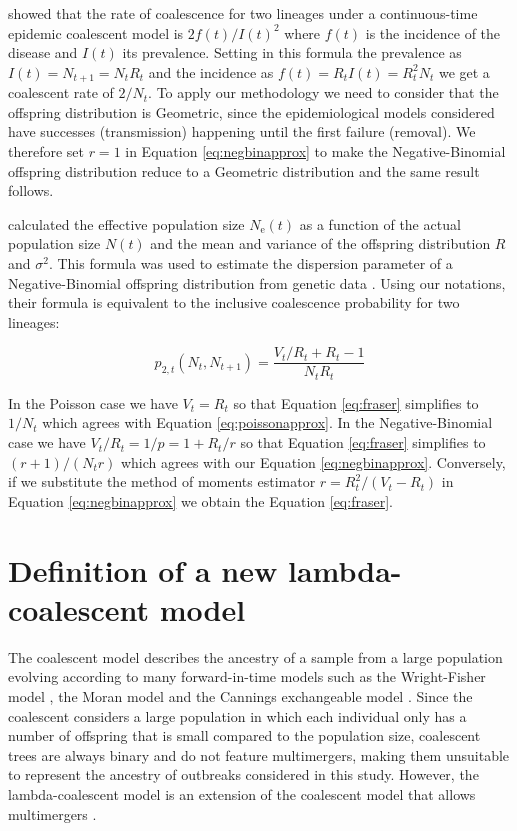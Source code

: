 \documentclass{article}
\renewcommand{\eqref}[1]{\ref{#1}}
\begin{document}
\citet{Volz2012a} showed that the rate of coalescence for two lineages under a continuous-time epidemic coalescent model is $2f(t)/I(t)^2$
 where $f(t)$ is the incidence of the disease and $I(t)$ its prevalence. 
 Setting in this formula the prevalence as $I(t)=N_{t+1}=N_t R_t$ and the incidence as
 $f(t)=R_t I(t)=R_t^2 N_t$ we get a coalescent rate of 
 $2/N_t$. To apply our methodology we need to consider that
the offspring distribution is Geometric, since the epidemiological
 models considered have successes (transmission) happening until the first failure
 (removal). We therefore set $r=1$ in Equation \eqref{eq:negbinapprox} 
 to make the Negative-Binomial offspring distribution
 reduce to a Geometric distribution and the same result follows.

\citet{Fraser2017} calculated the effective population size $N_\mathrm{e}(t)$ 
as a function of the actual population size $N(t)$ and the mean and variance of the offspring distribution $R$ and $\sigma^2$. %
This formula was used to estimate the dispersion parameter of a Negative-Binomial offspring distribution from genetic data \citep{Li2017}.
Using our notations, their formula is equivalent to the inclusive coalescence 
probability for two lineages:

\begin{equation}
 p_{2,t}(N_t, N_{t+1})=\frac{V_t/R_t+R_t-1}{N_t R_t}\label{eq:fraser}
 \end{equation}

In the Poisson case we have $V_t=R_t$ so that Equation \eqref{eq:fraser} simplifies to $1/N_t$ which agrees with Equation \eqref{eq:poissonapprox}. 
In the Negative-Binomial case we have $V_t/R_t=1/p=1+R_t/r$ so that Equation \eqref{eq:fraser}
simplifies to $(r+1)/(N_t r)$ which agrees with our Equation \eqref{eq:negbinapprox}. 
Conversely, if we substitute the method of moments estimator 
$r=R_t^2/(V_t-R_t)$
in Equation \eqref{eq:negbinapprox} we obtain the Equation \eqref{eq:fraser}.

\section{Definition of a new lambda-coalescent model}

The coalescent model \citep{Kingman1982,Kingman1982a} describes the ancestry of a sample from a large population 
evolving according to many forward-in-time models such as the Wright-Fisher model \citep{Wright1931,Fisher1930}, 
the Moran model \citep{Moran1958} and the Cannings exchangeable model \citep{Cannings1974}.
Since the coalescent considers a large population in which each individual only has a number of offspring that is small
compared to the population size, coalescent trees are always binary and do not feature multimergers,
making them unsuitable to represent the ancestry of outbreaks considered in this study.
However, the lambda-coalescent model is an extension of the coalescent model that 
allows multimergers
\citep{pitmanCoalescentsMultipleCollisions1999,sagitovGeneralCoalescentAsynchronous1999,donnellyParticleRepresentationsMeasureValued1999}. 
\end{document}
